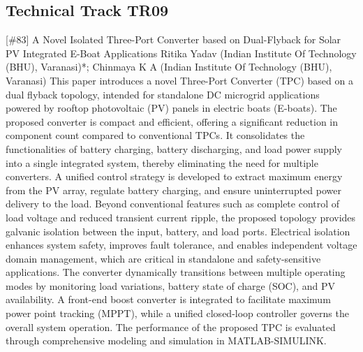 \clearpage \subsection{Technical Track TR09}\nopagebreak {} \begin{abstract_online} {[\#83] A Novel Isolated Three-Port Converter based on Dual-Flyback for Solar PV Integrated E-Boat Applications} {} {Ritika Yadav (Indian Institute Of Technology (BHU), Varanasi)*; Chinmaya K A (Indian Institute Of Technology (BHU), Varanasi)} {} This paper introduces a novel Three-Port Converter (TPC) based on a dual flyback topology, intended for standalone DC microgrid applications powered by rooftop photovoltaic (PV) panels in electric boats (E-boats). The proposed converter is compact and efficient, offering a significant reduction in component count compared to conventional TPCs. It consolidates the functionalities of battery charging, battery discharging, and load power supply into a single integrated system, thereby eliminating the need for multiple converters. A unified control strategy is developed to extract maximum energy from the PV array, regulate battery charging, and ensure uninterrupted power delivery to the load. Beyond conventional features such as complete control of load voltage and reduced transient current ripple, the proposed topology provides galvanic isolation between the input, battery, and load ports. Electrical isolation enhances system safety, improves fault tolerance, and enables independent voltage domain management, which are critical in standalone and safety-sensitive applications. The converter dynamically transitions between multiple operating modes by monitoring load variations, battery state of charge (SOC), and PV availability. A front-end boost converter is integrated to facilitate maximum power point tracking (MPPT), while a unified closed-loop controller governs the overall system operation. The performance of the proposed TPC is evaluated through comprehensive modeling and simulation in MATLAB-SIMULINK. \end{abstract_online} 

